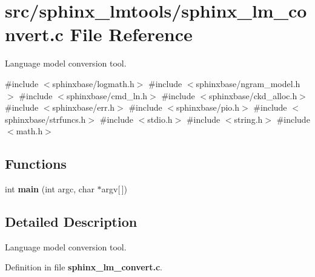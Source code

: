 \section{src/sphinx\-\_\-lmtools/sphinx\-\_\-lm\-\_\-convert.c \-File \-Reference}
\label{sphinx__lm__convert_8c}


\-Language model conversion tool.  


{\ttfamily \#include $<$sphinxbase/logmath.\-h$>$}\*
{\ttfamily \#include $<$sphinxbase/ngram\-\_\-model.\-h$>$}\*
{\ttfamily \#include $<$sphinxbase/cmd\-\_\-ln.\-h$>$}\*
{\ttfamily \#include $<$sphinxbase/ckd\-\_\-alloc.\-h$>$}\*
{\ttfamily \#include $<$sphinxbase/err.\-h$>$}\*
{\ttfamily \#include $<$sphinxbase/pio.\-h$>$}\*
{\ttfamily \#include $<$sphinxbase/strfuncs.\-h$>$}\*
{\ttfamily \#include $<$stdio.\-h$>$}\*
{\ttfamily \#include $<$string.\-h$>$}\*
{\ttfamily \#include $<$math.\-h$>$}\*
\subsection*{\-Functions}
\begin{DoxyCompactItemize}
\item 
int {\bfseries main} (int argc, char $\ast$argv[$\,$])\label{sphinx__lm__convert_8c_a0ddf1224851353fc92bfbff6f499fa97}

\end{DoxyCompactItemize}


\subsection{\-Detailed \-Description}
\-Language model conversion tool. 

\-Definition in file {\bf sphinx\-\_\-lm\-\_\-convert.\-c}.

